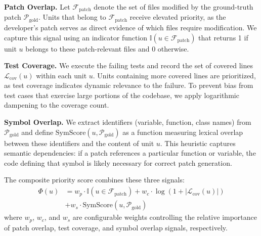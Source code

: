 \documentclass[sigconf,nonacm]{acmart}
\begin{document}
\textbf{Patch Overlap.} Let $\mathcal{F}_\mathrm{patch}$ denote the set of files modified by the ground-truth patch $\mathcal{P}_\mathrm{gold}$. Units that belong to $\mathcal{F}_\mathrm{patch}$ receive elevated priority, as the developer's patch serves as direct evidence of which files require modification. We capture this signal using an indicator function $\mathbb{I}(u \in \mathcal{F}_\mathrm{patch})$ that returns 1 if unit $u$ belongs to these patch-relevant files and 0 otherwise.

\textbf{Test Coverage.} We execute the failing tests and record the set of covered lines $\mathcal{L}_\mathrm{cov}(u)$ within each unit $u$. Units containing more covered lines are prioritized, as test coverage indicates dynamic relevance to the failure. To prevent bias from test cases that exercise large portions of the codebase, we apply logarithmic dampening to the coverage count.

\textbf{Symbol Overlap.} We extract identifiers (variable, function, class names) from $\mathcal{P}_\mathrm{gold}$ and define $\text{SymScore}(u, \mathcal{P}_\mathrm{gold})$ as a function measuring lexical overlap between these identifiers and the content of unit $u$. This heuristic captures semantic dependencies: if a patch references a particular function or variable, the code defining that symbol is likely necessary for correct patch generation.

The composite priority score combines these three signals:
\begin{align*}
  \Phi(u) &= w_p \cdot \mathbb{I}(u \in \mathcal{F}_\mathrm{patch}) + w_c \cdot \log(1 + |\mathcal{L}_\mathrm{cov}(u)|) \\
  &+ w_s \cdot \text{SymScore}(u, \mathcal{P}_\mathrm{gold})
\end{align*}
where $w_p$, $w_c$, and $w_s$ are configurable weights controlling the relative importance of patch overlap, test coverage, and symbol overlap signals, respectively.

\end{document}
